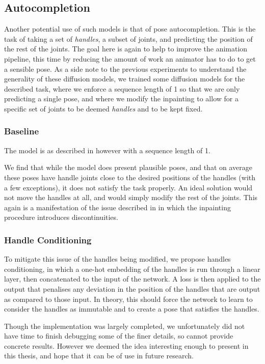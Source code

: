 \subsection{Autocompletion}
\label{sec:autocomplete}

Another potential use of such models is that of pose autocompletion. This is the task of taking a set of \textit{handles}, a subset of joints, and predicting the position of the rest of the joints. The goal here is again to help to improve the animation pipeline, this time by reducing the amount of work an animator has to do to get a sensible pose. As a side note to the previous experiments to understand the generality of these diffusion models, we trained some diffusion models for the described task, where we enforce a sequence length of 1 so that we are only predicting a single pose, and where we modify the inpainting to allow for a specific set of joints to be deemed \textit{handles} and to be kept fixed.

\subsubsection{Baseline}
The model is as described in  however with a sequence length of 1.

We find that while the model does present plausible poses, and that on average these poses have handle joints close to the desired positions of the handles (with a few exceptions), it does not satisfy the task properly.  An ideal solution would not move the handles at all, and would simply modify the rest of the joints. This again is a manifestation of the issue described in  in which the inpainting procedure introduces discontinuities.

\subsubsection{Handle Conditioning}
To mitigate this issue of the handles being modified, we propose handles conditioning, in which a one-hot embedding of the handles is run through a linear layer, then concatenated to the input of the network. A loss is then applied to the output that penalises any deviation in the position of the handles that are output as compared to those input. In theory, this should force the network to learn to consider the handles as immutable and to create a pose that satisfies the handles.

Though the implementation was largely completed, we unfortunately did not have time to finish debugging some of the finer details, so cannot provide concrete results. However we deemed the idea interesting enough to present in this thesis, and hope that it can be of use in future research.


